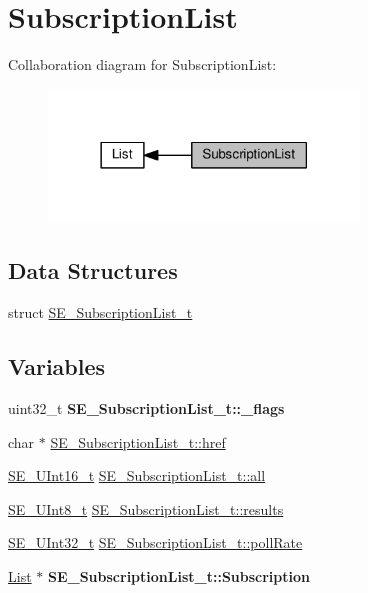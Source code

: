 \hypertarget{group__SubscriptionList}{}\section{Subscription\+List}
\label{group__SubscriptionList}
Collaboration diagram for Subscription\+List\+:\nopagebreak
\begin{figure}[H]
\begin{center}
\leavevmode
\includegraphics[width=234pt]{group__SubscriptionList}
\end{center}
\end{figure}
\subsection*{Data Structures}
\begin{DoxyCompactItemize}
\item 
struct \hyperlink{structSE__SubscriptionList__t}{S\+E\+\_\+\+Subscription\+List\+\_\+t}
\end{DoxyCompactItemize}
\subsection*{Variables}
\begin{DoxyCompactItemize}
\item 
\mbox{\label{group__SubscriptionList_gaf6e7cb367235b9ddb40a60350509eea9}} 
uint32\+\_\+t {\bfseries S\+E\+\_\+\+Subscription\+List\+\_\+t\+::\+\_\+flags}
\item 
char $\ast$ \hyperlink{group__SubscriptionList_ga1d0cf0063d777a5d8eee92223453fc62}{S\+E\+\_\+\+Subscription\+List\+\_\+t\+::href}
\item 
\hyperlink{group__UInt16_gac68d541f189538bfd30cfaa712d20d29}{S\+E\+\_\+\+U\+Int16\+\_\+t} \hyperlink{group__SubscriptionList_ga596701373b60b51568eb8c8b02fd402d}{S\+E\+\_\+\+Subscription\+List\+\_\+t\+::all}
\item 
\hyperlink{group__UInt8_gaf7c365a1acfe204e3a67c16ed44572f5}{S\+E\+\_\+\+U\+Int8\+\_\+t} \hyperlink{group__SubscriptionList_ga5af7ce11fb113e0ed4ff19b7d8c94b9a}{S\+E\+\_\+\+Subscription\+List\+\_\+t\+::results}
\item 
\hyperlink{group__UInt32_ga70bd4ecda3c0c85d20779d685a270cdb}{S\+E\+\_\+\+U\+Int32\+\_\+t} \hyperlink{group__SubscriptionList_gab52e8c80eb79611d26ca5ba9bd2ddfb7}{S\+E\+\_\+\+Subscription\+List\+\_\+t\+::poll\+Rate}
\item 
\mbox{\label{group__SubscriptionList_ga2a11463820225ae02f0a0aa5ce0423fe}} 
\hyperlink{structList}{List} $\ast$ {\bfseries S\+E\+\_\+\+Subscription\+List\+\_\+t\+::\+Subscription}
\end{DoxyCompactItemize}


